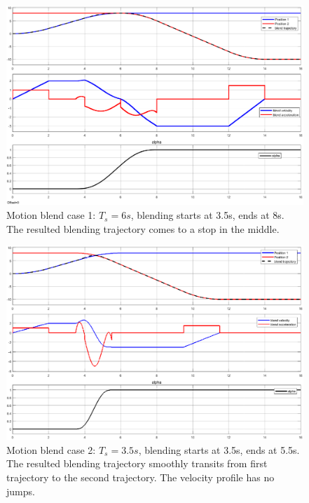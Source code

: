 \documentclass{amsart}
\theoremstyle{plain}
\numberwithin{equation}{section}
\begin{document}
\begin{enumerate}
	\begin{figure}%
	\includegraphics[width=\columnwidth]{figure/blend_case_1.eps}%
	\caption{Motion blend case 1: $T_s = 6s$, blending starts at 3.5s, ends at 8s. The resulted blending trajectory comes to a stop in the middle.}%
	\label{blend_case_1}%
	\end{figure}

	\begin{figure}%
	\includegraphics[width=\columnwidth]{figure/blend_case_2.eps}%
	\caption{Motion blend case 2: $T_s = 3.5s$, blending starts at 3.5s, ends at 5.5s. The resulted blending trajectory smoothly transits from first trajectory to the second trajectory. The velocity profile has no jumps.}%
	\label{blend_case_2}%
	\end{figure}


\end{enumerate}
\end{document}
